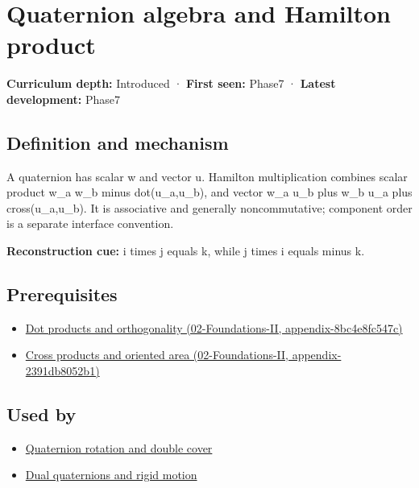 \hypertarget{appendix-965d9260eeab}{}
\section{Quaternion algebra and Hamilton product}\label{appendix-965d9260eeab-quaternion-algebra-and-hamilton-product}

\textbf{Curriculum depth:} Introduced · \textbf{First seen:} Phase7 · \textbf{Latest development:} Phase7

\subsection{Definition and mechanism}\label{appendix-965d9260eeab-definition-and-mechanism}

A quaternion has scalar w and vector u. Hamilton multiplication combines scalar product w\_a w\_b minus dot(u\_a,u\_b), and vector w\_a u\_b plus w\_b u\_a plus cross(u\_a,u\_b). It is associative and generally noncommutative; component order is a separate interface convention.

\textbf{Reconstruction cue:} i times j equals k, while j times i equals minus k.

\subsection{Prerequisites}\label{appendix-965d9260eeab-prerequisites}

\begin{itemize}
\tightlist
\item
  \href{../02-Foundations-II/main.pdf\#nameddest=appendix-8bc4e8fc547c}{Dot products and orthogonality (02-Foundations-II, appendix-8bc4e8fc547c)}
\item
  \href{../02-Foundations-II/main.pdf\#nameddest=appendix-2391db8052b1}{Cross products and oriented area (02-Foundations-II, appendix-2391db8052b1)}
\end{itemize}

\subsection{Used by}\label{appendix-965d9260eeab-used-by}

\begin{itemize}
\tightlist
\item
  \hyperref[appendix-8e61ab68f6b2]{Quaternion rotation and double cover}
\item
  \hyperref[appendix-d1ea57347893]{Dual quaternions and rigid motion}
\end{itemize}

